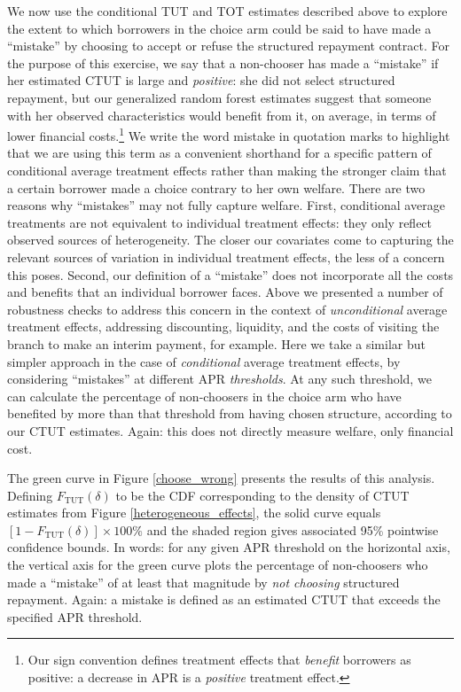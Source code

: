 \documentclass[12pt, a4paper, colorinlistoftodos]{article}
\begin{document}
We now use the conditional TUT and TOT estimates described above to explore the extent to which borrowers in the choice arm could be said to have made a ``mistake'' by choosing to accept or refuse the structured repayment contract.
For the purpose of this exercise, we say that a non-chooser has made a ``mistake'' if her estimated CTUT is large and \emph{positive}: she did not select structured repayment, but our generalized random forest estimates suggest that someone with her observed characteristics would benefit from it, on average, in terms of lower financial costs.\footnote{Our sign convention defines treatment effects that \emph{benefit} borrowers as positive: a decrease in APR is a \emph{positive} treatment effect.} 
We write the word mistake in quotation marks to highlight that we are using this term as a convenient shorthand for a specific pattern of conditional average treatment effects rather than making the stronger claim that a certain borrower made a choice contrary to her own welfare. 
There are two reasons why ``mistakes'' may not fully capture welfare.
First, conditional average treatments are not equivalent to individual treatment effects: they only reflect observed sources of heterogeneity. 
The closer our covariates come to capturing the relevant sources of variation in individual treatment effects, the less of a concern this poses.
Second, our definition of a ``mistake'' does not incorporate all the costs and benefits that an individual borrower faces. 
Above we presented a number of robustness checks to address this concern in the context of \emph{unconditional} average treatment effects, addressing discounting, liquidity, and the costs of visiting the branch to make an interim payment, for example.
Here we take a similar but simpler approach in the case of \emph{conditional} average treatment effects, by considering ``mistakes'' at different APR \emph{thresholds}.
At any such threshold, we can calculate the percentage of non-choosers in the choice arm who have benefited by more than that threshold from having chosen structure, according to our CTUT estimates. 
Again: this does not directly measure welfare, only financial cost.

The green curve in Figure \ref{choose_wrong} presents the results of this analysis.
Defining $F_{\text{TUT}}(\delta)$ to be the CDF corresponding to the density of  CTUT estimates from Figure \ref{heterogeneous_effects}, the solid curve equals $[1 - F_{\text{TUT}}(\delta)] \times 100\%$ and the shaded region gives associated 95\% pointwise confidence bounds.
In words: for any given APR threshold on the horizontal axis, the vertical axis for the green curve plots the percentage of non-choosers who made a ``mistake'' 
 of at least that magnitude by \emph{not choosing} structured repayment.
Again: a mistake is defined as an estimated CTUT that exceeds the specified APR threshold. 
\end{document}
